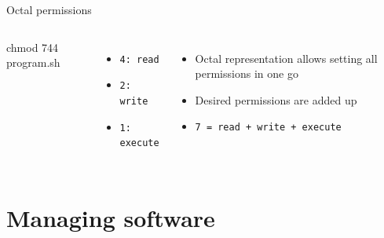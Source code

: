     \begin{frame}[t,fragile]{Octal permissions}
        \begin{columns}[T]
            \begin{bashenv}[\small]
chmod 744 program.sh
            \end{bashenv}
            \begin{itemize}
                \item \texttt{4: read}
                \item \texttt{2: write}
                \item \texttt{1: execute}
            \end{itemize}
            \begin{itemize}
                \item Octal representation allows setting all permissions in one go
                \item Desired permissions are added up
                \item \texttt{7 = read + write + execute}
            \end{itemize}
        \end{columns}
    \end{frame}

    \section{Managing software}

